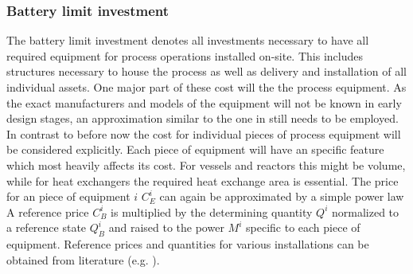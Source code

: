     \subsubsection{Battery limit investment}
        The battery limit investment denotes all investments necessary to have all required equipment
        for process operations installed on-site. This includes structures necessary to house the process as well as
        delivery and installation of all individual assets.  One major part of these cost will the the process
        equipment. As the exact manufacturers and models of the equipment will not be known in early design
        stages, an approximation similar to the one in  still needs to be employed. In contrast to
        before now the cost for individual pieces of process equipment will be considered explicitly.
        Each piece of equipment will have an specific feature which most heavily affects its cost. For vessels and
        reactors this might be volume, while for heat exchangers the required heat exchange area is essential.
        The price for an piece of equipment  $i$ $C^{i}_E$ can again be approximated by a simple power law
        A reference price $C^{i}_B$ is multiplied by the determining quantity $Q^{i}$ normalized to a reference state
        $Q^{i}_B$ and raised to the power $M^{i}$ specific to each piece of equipment. Reference prices and
        quantities for various installations can be obtained from literature (e.g. \cite{Seider.2010}).

